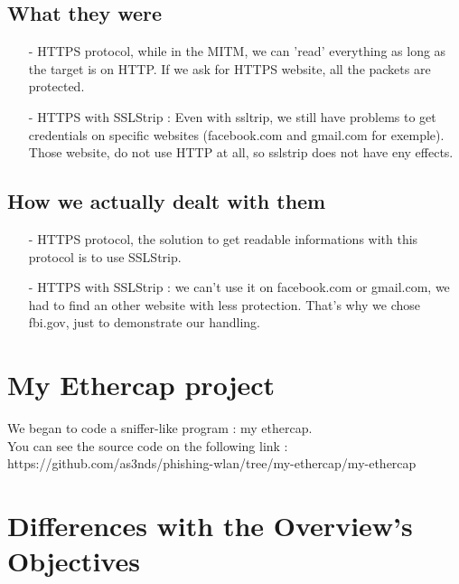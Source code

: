 \documentclass[a4paper, 11pt, oneside]{article}
\begin{document}
\subsection{What they were}
\begin{itemize}
    \item[-] HTTPS protocol, while in the MITM, we can 'read' everything as long as the target is on HTTP. If we ask for HTTPS website, all the packets are protected. \\
    \item[-] HTTPS with SSLStrip : Even with ssltrip, we still have problems to get credentials on specific websites (facebook.com and gmail.com for exemple). Those website, do not use HTTP at all, so sslstrip does not have eny effects.\\
\end{itemize}

\subsection{How we actually dealt with them}
\begin{itemize}
    \item[-] HTTPS protocol, the solution to get readable informations with this protocol is to use SSLStrip.\\
    \item[-] HTTPS with SSLStrip : we can't use it on facebook.com or gmail.com, we had to find an other website with less protection. That's why we chose fbi.gov, just to demonstrate our handling.\\
\end{itemize}

\section{My Ethercap project}

We began to code a sniffer-like program : my ethercap. \\
You can see the source code on the following link : \\
https://github.com/as3nds/phishing-wlan/tree/my-ethercap/my-ethercap\\
  

\section{Differences with the Overview's Objectives}
\end{document}
